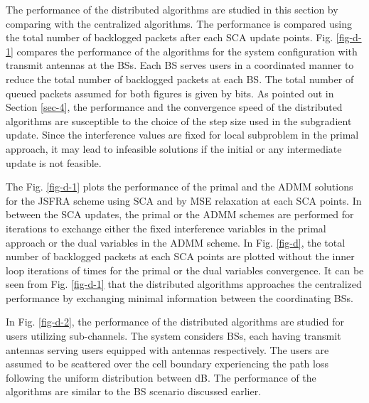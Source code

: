 
The performance of the distributed algorithms are studied in this section by comparing with the centralized algorithms. The performance is compared using the total number of backlogged packets after each \ac{SCA} update points. Fig. \ref{fig-d-1} compares the performance of the algorithms for the system configuration  with  transmit antennas at the \acp{BS}. Each \ac{BS} serves  users in a coordinated manner to reduce the total number of backlogged packets at each \ac{BS}. The total number of queued packets assumed for both figures is given by  bits. As pointed out in Section \ref{sec-4}, the performance and the convergence speed of the distributed algorithms are susceptible to the choice of the step size used in the subgradient update. Since the interference values are fixed for local subproblem in the primal approach, it may lead to infeasible solutions if the initial or any intermediate update is not feasible.

The Fig. \ref{fig-d-1} plots the performance of the primal and the \ac{ADMM} solutions for the \ac{JSFRA} scheme using \ac{SCA} and by \ac{MSE} relaxation at each \ac{SCA} points. In between the \ac{SCA} updates, the primal or the \ac{ADMM} schemes are performed for  iterations to exchange either the fixed interference variables in the primal approach or the dual variables in the \ac{ADMM} scheme. In Fig. \ref{fig-d}, the total number of backlogged packets at each \ac{SCA} points are plotted without the inner loop iterations of  times for the primal or the dual variables convergence. It can be seen from Fig. \ref{fig-d-1} that the distributed algorithms approaches the centralized performance by exchanging minimal information between the coordinating \acp{BS}.
\begin{figure*}
\centering
{}
\hfill
{}
\caption{Number of backlogged packets at each \ac{SCA} points}
\label{fig-d}
\end{figure*}

In Fig. \ref{fig-d-2}, the performance of the distributed algorithms are studied for  users utilizing  sub-channels. The system considers  \acp{BS}, each having  transmit antennas serving  users equipped with  antennas respectively. The users are assumed to be scattered over the cell boundary experiencing the path loss following the uniform distribution between \me{[0,-6]} dB. The performance of the algorithms are similar to the  \ac{BS} scenario discussed earlier.

